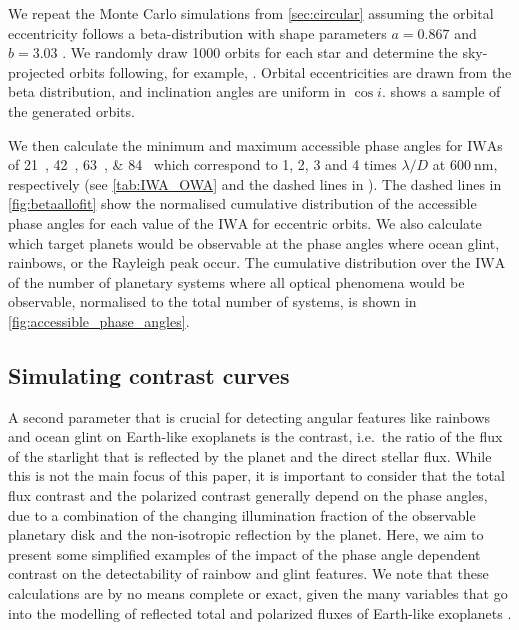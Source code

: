 \documentclass[
    usenatbib,
]{mnras}
\newcommand{\IWA}{\ensuremath{\mathrm{IWA}}}
\begin{document}
We repeat the Monte Carlo simulations from \cref{sec:circular} assuming 
the orbital eccentricity follows a beta-distribution with shape parameters 
$a=0.867$ and $b=3.03$ \citep{2013MNRAS.434L..51K}. 
%
We randomly draw \num{1000} orbits for each star and determine the sky-projected orbits following, for example, \citet{2010exop.book...15M}. 
Orbital eccentricities are drawn from the beta distribution, and 
inclination angles are uniform in $\cos i$. 
 shows a sample of the generated orbits.
%

We then calculate the minimum and maximum accessible phase 
angles for \IWA{}s of \qtylist{21; 42; 63; 84}{\mas} which correspond to 1, 2, 3 and 4 times $\lambda / D$ at $\qty{600}{\nano\meter}$, respectively (see \cref{tab:IWA_OWA} and the dashed lines in ).
%
The dashed lines in \cref{fig:betaallofit} show the normalised cumulative 
distribution of the accessible phase angles for each value of the 
\IWA{} for eccentric orbits. 
%
We also calculate which target planets would be observable at the phase angles where ocean glint, rainbows, or the Rayleigh peak occur.
%
The cumulative distribution over the \IWA{} of the number of planetary systems where all optical phenomena would be observable, normalised to the total number of systems, is shown in \cref{fig:accessible_phase_angles}.
%

\subsection{Simulating contrast curves}
\label{subsec:2.4}

A second parameter that is crucial for detecting angular features like 
rainbows and ocean glint on Earth-like exoplanets is the contrast, i.e.\ 
the ratio of the flux of the starlight that is reflected by the planet 
and the direct stellar flux. 
%
While this is not the main focus of this paper, it is important to consider that the total flux contrast and the polarized contrast generally 
depend on the phase angles, due to a combination of the changing illumination fraction of the observable planetary disk and the non-isotropic reflection by the planet.
%
Here, we aim to present some simplified examples of the impact of the 
phase angle dependent contrast on the detectability of rainbow and 
glint features. 
%
We note that these calculations are by no means complete or exact, given 
the many variables that go into the modelling of reflected total and
polarized fluxes of Earth-like exoplanets \citep{ treesandstam2019,trees2022}.
%
\end{document}
